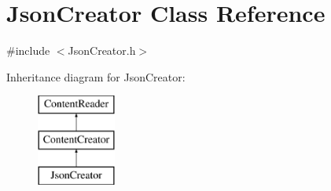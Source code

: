 \hypertarget{classJsonCreator}{}\section{Json\+Creator Class Reference}
\label{classJsonCreator}


{\ttfamily \#include $<$Json\+Creator.\+h$>$}

Inheritance diagram for Json\+Creator\+:\begin{figure}[H]
\begin{center}
\leavevmode
\includegraphics[height=3.000000cm]{classJsonCreator}
\end{center}
\end{figure}
